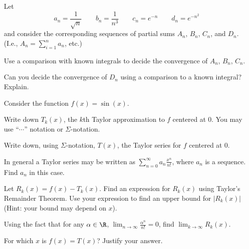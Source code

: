 \documentclass{workbook}
\begin{document}
\begin{slide}
	\question
	Let
	\[
		a_n =\frac{1}{\sqrt{n}}\qquad b_n=\frac{1}{n^3}\qquad c_n=e^{-n}
		\qquad d_n=e^{-n^2}
	\]
	and consider the corresponding sequences of partial sums $A_n$, $B_n$,
	$C_n$, and $D_n$. (I.e., $\displaystyle A_n=\sum_{i=1}^n a_n$, etc.)

	\begin{parts}
		\item Use a comparison with known integrals to decide
		the convergence of $A_n$, $B_n$, $C_n$.
		\item Can you decide the convergence of $D_n$ using a comparison to
		a known integral? Explain.
	\end{parts}
\end{slide}

\begin{slide}
	\question
	Consider the function $f(x)=\sin(x)$.

	\begin{parts}
		\item Write down $T_k(x)$, the $k$th Taylor approximation to
		$f$ centered at $0$. You may use ``$\cdots$'' notation or $\Sigma$-notation.

		\item Write down, using $\Sigma$-notation, $T(x)$, the Taylor series
		for $f$ centered at $0$.

		\item In general a Taylor series may be written as $\displaystyle
			\sum_{n=0}^\infty a_n \frac{x^{n}}{n!}$, where $a_n$ is a sequence.
		Find $a_n$ in this case.

		\item Let $R_k(x)=f(x)-T_k(x)$. Find an expression for $R_k(x)$
		using Taylor's Remainder Theorem. Use your expression to find an upper bound for $|R_k(x)|$ (Hint: your bound may depend on $x$).

		\item Using the fact that for any $\alpha\in \R$,
		$\displaystyle \lim_{n\to\infty} \frac{\alpha^n}{n!}=0$,
		find $\displaystyle \lim_{k\to\infty} R_k(x)$.

		\item For which $x$ is $f(x)=T(x)$? Justify your answer.
	\end{parts}
\end{slide}
\end{document}
